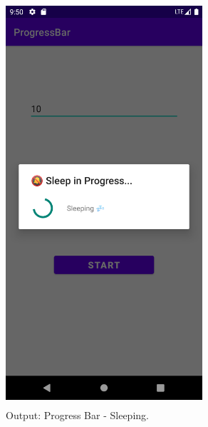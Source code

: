 \documentclass[12pt, a4]{article}
\begin{document}
\subsection*{}
\begin{figure}[h]
\centering
\caption{Output: Progress Bar - Sleeping.}
\includegraphics[height=15cm, width=7.3cm]{ProgressBar/Screenshots/Output-2.png}
\end{figure}

\newpage
\end{document}
